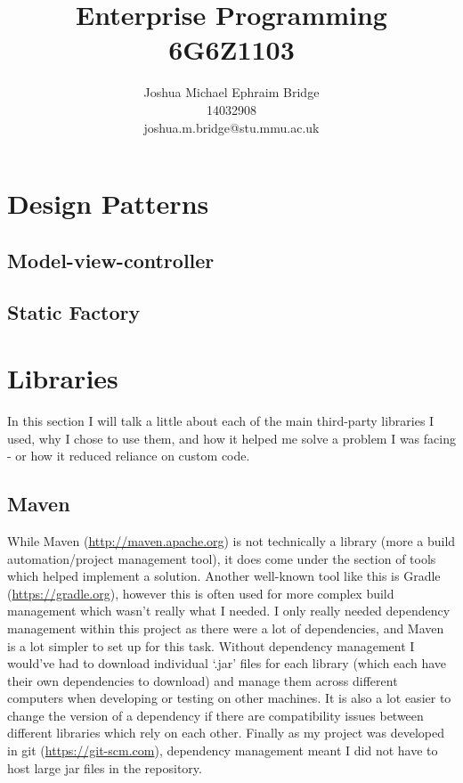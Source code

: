 \documentclass[12pt]{article}
\title{\vspace{2cm}\textbf{Enterprise Programming}\\6G6Z1103}
\author{Joshua Michael Ephraim Bridge\\14032908\\joshua.m.bridge@stu.mmu.ac.uk}
\begin{document}
\maketitle

\tableofcontents

\newpage

\section{Design Patterns}
  \subsection{Model-view-controller}
  \subsection{Static Factory}

\section{Libraries}
  In this section I will talk a little about each of the main third-party libraries I used, why I chose to use them, and how it helped me solve a problem I was facing - or how it reduced reliance on custom code.

  \subsection{Maven}
    While Maven (\url{http://maven.apache.org}) is not technically a library (more a build automation/project management tool), it does come under the section of tools which helped implement a solution. Another well-known tool like this is Gradle (\url{https://gradle.org}), however this is often used for more complex build management which wasn't really what I needed. I only really needed dependency management within this project as there were a lot of dependencies, and Maven is a lot simpler to set up for this task. Without dependency management I would've had to download individual ‘.jar’ files for each library (which each have their own dependencies to download) and manage them across different computers when developing or testing on other machines. It is also a lot easier to change the version of a dependency if there are compatibility issues between different libraries which rely on each other. Finally as my project was developed in git (\url{https://git-scm.com}), dependency management meant I did not have to host large jar files in the repository.
\end{document}
